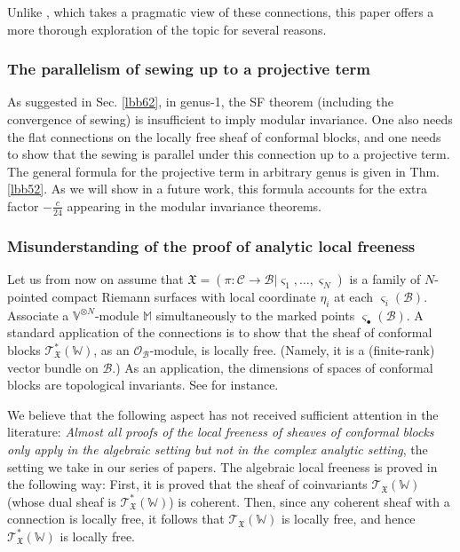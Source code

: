 \documentclass[11pt,b5paper,notitlepage]{article}
\theoremstyle{definition}
\theoremstyle{plain}
\newcommand{\scr}{\mathscr}
\newcommand{\sgm}{\varsigma}
\newcommand{\blt}{\bullet}
\newcommand{\Vbb}{\mathbb V}
\newcommand{\Wbb}{\mathbb W}
\newcommand{\Mbb}{\mathbb M}
\newcommand{\<}{\left\langle}
\renewcommand{\>}{\right\rangle}
\newcommand{\MO}{\mathcal{O}}
\newcommand{\MC}{\mathcal{C}}
\newcommand{\MB}{\mathcal{B}}
\newcommand{\fx}{\mathfrak{X}}
\numberwithin{equation}{section}
\begin{document}
Unlike \cite{Gui-sewingconvergence}, which takes a pragmatic view of these connections, this paper offers a more thorough exploration of the topic for several reasons.


\subsubsection*{The parallelism of sewing up to a projective term}

As suggested in Sec. \ref{lbb62}, in genus-1, the SF theorem (including the convergence of sewing) is insufficient to imply modular invariance. One also needs the flat connections on the locally free sheaf of conformal blocks, and one needs to show that the sewing is parallel under this connection up to a projective term. The general formula for the projective term in arbitrary genus is given in Thm. \ref{lbb52}. As we will show in a future work, this formula accounts for the extra factor $-\frac c{24}$ appearing in the modular invariance theorems.


\subsubsection*{Misunderstanding of the proof of analytic local freeness}

Let us from now on assume that $\fx=(\pi:\MC\rightarrow\MB|\sgm_1,\dots,\sgm_N)$ is a family of $N$-pointed compact Riemann surfaces with local coordinate $\eta_i$ at each $\sgm_i(\MB)$. Associate a $\Vbb^{\otimes N}$-module $\Mbb$ simultaneously to the marked points $\sgm_\blt(\MB)$. A standard application of the connections is to show that the sheaf of conformal blocks $\scr T^*_\fx(\Wbb)$, as an $\MO_\MB$-module, is locally free. (Namely, it is a (finite-rank) vector bundle on $\MB$.) As an application, the dimensions of spaces of conformal blocks are topological invariants. See \cite{TUY,Ueno97,Ueno08,NT-P1_conformal_blocks,DGT2} for instance. 


We believe that the following aspect has not received sufficient attention in the literature: \textit{Almost all proofs of the local freeness of sheaves of conformal blocks only apply in the algebraic setting but not in the complex analytic setting}, the setting we take in our series of papers. The algebraic local freeness is proved in the following way: First, it is proved that the sheaf of coinvariants $\scr T_\fx(\Wbb)$ (whose dual sheaf is $\scr T_\fx^*(\Wbb)$) is coherent. Then, since any coherent sheaf with a connection is locally free, it follows that $\scr T_\fx(\Wbb)$ is locally free, and hence $\scr T_\fx^*(\Wbb)$ is locally free. 
\end{document}
